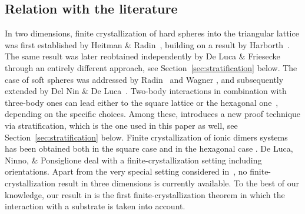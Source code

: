 \documentclass[reqno]{amsart}
\theoremstyle{plain}
\theoremstyle{definition}
\numberwithin{equation}{section}
\begin{document}
\subsection{Relation with the literature}\label{sec:literature}
In two dimensions, finite crystallization of hard spheres into the
triangular lattice was first established by  {\sc Heitman \& Radin}~\cite{HR}, building on a result by
 {\sc Harborth}~\cite{Harborth}. The same result was later reobtained
 independently by {\sc De Luca \& Friesecke}~\cite{Lucia}  through
  an entirely different approach, see
 Section~\ref{sec:stratification} below. The case of soft spheres was addressed
by {\sc Radin}~\cite{Radin} and {\sc Wagner}
\cite{Wagner83}, and subsequently extended by {\sc Del Nin \& De Luca}~\cite{LuciaDelNin}. Two-body interactions
in combination with three-body ones can lead either to the square lattice
\cite{Mainini-Piovano} or the hexagonal one~\cite{Mainini}, depending on the
specific choices. Among these, \cite{FriedrichKreutz} introduces a new proof
technique via stratification, which is the one used in this paper as
well,  see
 Section~\ref{sec:stratification} below. Finite crystallization of ionic  dimers  systems has
been obtained both in the square case
 \cite{FriedrichKreutzSquare}  and in the hexagonal case
\cite{FriedrichKreutzHexagonal}. {\sc De Luca, Ninno, \& Ponsiglione}
\cite{DeLuca2} deal with a finite-crystallization
setting including orientations. Apart from the very special setting
considered  in~\cite{Lazzaroni}, no finite-crystallization result in
three  dimensions is currently available. To the best of our
knowledge,  our result in  is the first
finite-crystallization theorem in which the interaction with a substrate is taken into account.
\end{document}
